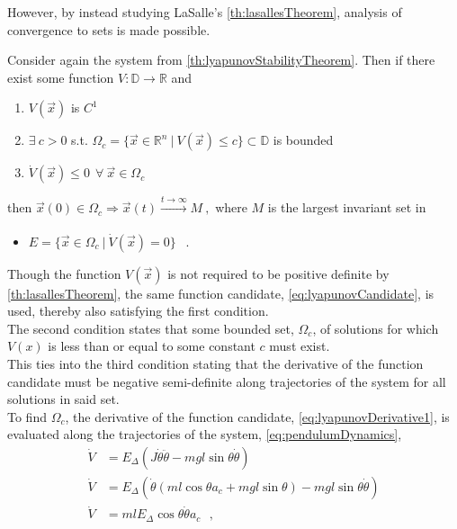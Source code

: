However, by instead studying LaSalle's \autoref{th:lasallesTheorem}, analysis of convergence to sets is made possible.
\begin{theorem}
  \label{th:lasallesTheorem}
  Consider again the system from \autoref{th:lyapunovStabilityTheorem}. Then if there exist some function $V : \mathbb{D} \rightarrow \mathbb{R}$ and \vspace{-12pt}
  \begin{enumerate}
    \item $V(\vec{x})$ is $C^1$
    \item $\exists\ c > 0$ s.t. $\Omega_c = \{\vec{x} \in \mathbb{R}^n \ | \ V(\vec{x}) \leq c \} \subset \mathbb{D}$ is bounded
    \item $\dot{V}(\vec{x}) \leq 0 \ \ \forall \ \vec{x} \in \Omega_c$
  \end{enumerate} \vspace{-12pt}
  then $\vec{x}(0) \in \Omega_c \Rightarrow \vec{x}(t) \xrightarrow[]{t \to \infty} M \ ,$  where $M$ is the largest invariant set in
  \vspace{-12pt}
  \begin{itemize}
    \item[] $E = \{ \vec{x} \in \Omega_c \ | \ \dot{V}(\vec{x}) = 0 \} \ \ $ \cite{HKKhalil}.
  \end{itemize}\vspace{-12pt}
\end{theorem}
%
Though the function $V(\vec{x})$ is not required to be positive definite by \autoref{th:lasallesTheorem}, the same function candidate, \autoref{eq:lyapunovCandidate}, is used, thereby also satisfying the first condition.\\
The second condition states that some bounded set, $\Omega_c$, of solutions for which $V(x)$ is less than or equal to some constant $c$ must exist.\\
This ties into the third condition stating that the derivative of the function candidate must be negative semi-definite along trajectories of the system for all solutions in said set.\\
To find $\Omega_c$, the derivative of the function candidate,  \autoref{eq:lyapunovDerivative1}, is evaluated along the trajectories of the system, \autoref{eq:pendulumDynamics},
\begin{align}
  \dot{V} &= E_\Delta ( J \dot{\theta} \ddot{\theta} - m g l \sin \theta \dot{\theta} )   \label{eq:lyapunovDerivative2} \\
  \dot{V} &= E_\Delta ( \dot{\theta} ( m l \cos \theta a_c + m g l \sin \theta )  - m g l \sin \theta \dot{\theta} )   \label{eq:lyapunovDerivative3} \\
  \dot{V} &= m l E_\Delta \cos \theta \dot{\theta} a_c   \ \ \ ,  \label{eq:lyapunovDerivative4}
\end{align}
